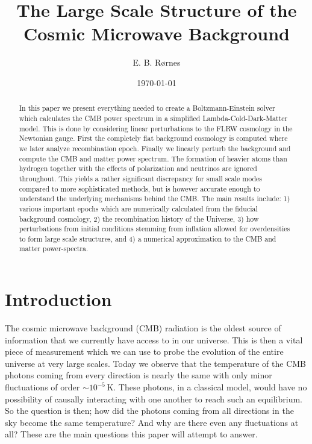 \documentclass[%
reprint,
 amsmath,amssymb,
 aps,
]{revtex4-2}
\begin{document}
\title{The Large Scale Structure of the Cosmic Microwave Background}

\author{E. B. Rørnes}

\date{\today}

\begin{abstract}
In this paper we present everything needed to create a Boltzmann-Einstein solver which calculates the CMB power spectrum in a simplified Lambda-Cold-Dark-Matter model. This is done by considering linear perturbations to the FLRW cosmology in the Newtonian gauge. First the completely flat background cosmology is computed where we later analyze recombination epoch. Finally we linearly perturb the background and compute the CMB and matter power spectrum. The formation of heavier atoms than hydrogen together with the effects of polarization and neutrinos are ignored throughout. This yields a rather significant discrepancy for small scale modes compared to more sophisticated methods, but is however accurate enough to understand the underlying mechanisms behind the CMB. The main results include: 1) various important epochs which are numerically calculated from the fiducial background cosmology, 2) the recombination history of the Universe, 3) how perturbations from initial conditions stemming from inflation allowed for overdensities to form large scale structures, and 4) a numerical approximation to the CMB and matter power-spectra.
\end{abstract}

\maketitle

\tableofcontents
\newpage
\section*{Introduction}
The cosmic microwave background (CMB) radiation is the oldest source of information that we currently have access to in our universe. This is then a vital piece of measurement which we can use to probe the evolution of the entire universe at very large scales. Today we observe that the temperature of the CMB photons coming from every direction is nearly the same with only minor fluctuations of order $\sim10^{-5}\,$K. These photons, in a classical model, would have no possibility of causally interacting with one another to reach such an equilibrium. So the question is then; how did the photons coming from all directions in the sky become the same temperature? And why are there even any fluctuations at all? These are the main questions this paper will attempt to answer.
\end{document}
